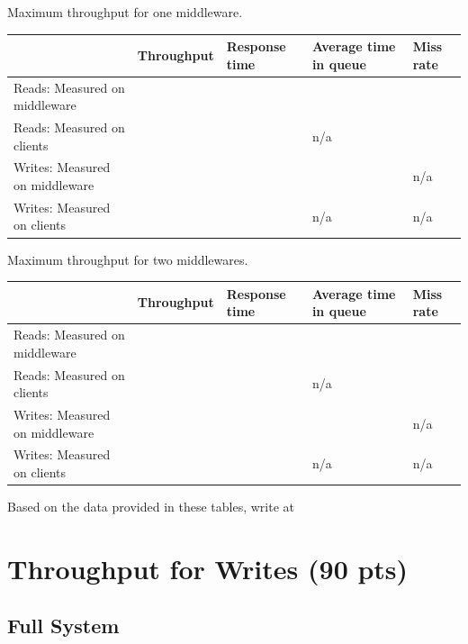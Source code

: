 \documentclass[11pt,a4paper]{article}
\begin{document}
\begin{center}
	{Maximum throughput for one middleware.}
	\begin{tabular}{|l|p{2cm}|p{2cm}|p{2cm}|p{2cm}|}
		\hline                                & Throughput & Response time & Average time in queue & Miss rate \\ 
		\hline Reads: Measured on middleware  &            &               &                       &           \\ 
		\hline Reads: Measured on clients     &            &               & n/a                   &           \\ 
		\hline Writes: Measured on middleware &            &               &                       & n/a       \\ 
		\hline Writes: Measured on clients    &            &               & n/a                   & n/a       \\ 
		\hline 
	\end{tabular}
\end{center}

\begin{center}
	{Maximum throughput for two middlewares.}
	\begin{tabular}{|l|p{2cm}|p{2cm}|p{2cm}|p{2cm}|}
		\hline                                & Throughput & Response time & Average time in queue & Miss rate \\ 
		\hline Reads: Measured on middleware  &            &               &                       &           \\ 
		\hline Reads: Measured on clients     &            &               & n/a                   &           \\ 
		\hline Writes: Measured on middleware &            &               &                       & n/a       \\ 
		\hline Writes: Measured on clients    &            &               & n/a                   & n/a       \\ 
		\hline 
	\end{tabular}
\end{center}

Based on the data provided in these tables, write at 

\section{Throughput for Writes (90 pts)}
%
\subsection{Full System}
%
\end{document}
